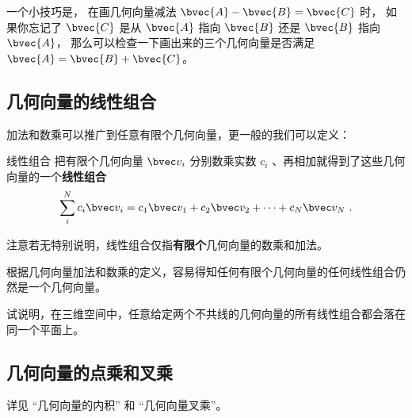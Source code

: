 一个小技巧是， 在画几何向量减法 $\bvec{A} - \bvec{B} = \bvec{C}$ 时， 如果你忘记了 $\bvec{C}$ 是从 $\bvec{A}$ 指向 $\bvec{B}$ 还是 $\bvec{B}$ 指向 $\bvec{A}$， 那么可以检查一下画出来的三个几何向量是否满足 $\bvec{A} = \bvec{B} + \bvec{C}$。


\subsection{几何向量的线性组合}

加法和数乘可以推广到任意有限个几何向量，更一般的我们可以定义：
\begin{definition}{线性组合}
把有限个几何向量 $\bvec v_i$ 分别数乘实数 $c_i$ 、再相加就得到了这些几何向量的一个\textbf{线性组合}
\begin{equation}\label{eq_GVecOp_1}
\sum_i^N c_i \bvec v_i = c_1\bvec v_1 + c_2\bvec v_2 +\dots +c_N \bvec v_N~.
\end{equation}
\end{definition}
注意若无特别说明，线性组合仅指\textbf{有限个}几何向量的数乘和加法。


根据几何向量加法和数乘的定义，容易得知任何有限个几何向量的任何线性组合仍然是一个几何向量。

\begin{exercise}{}
试说明，在三维空间中，任意给定两个不共线的几何向量的所有线性组合都会落在同一个平面上。
\end{exercise}

\subsection{几何向量的点乘和叉乘}
详见 “几何向量的内积” 和 “几何向量叉乘”。

